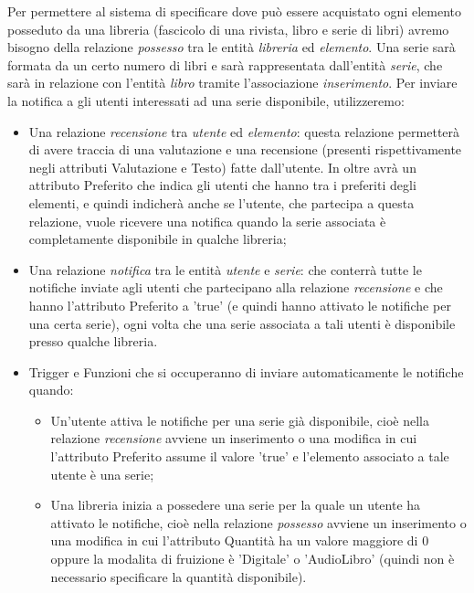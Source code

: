 \documentclass{article}
\begin{document}
Per permettere al sistema di specificare dove può essere acquistato ogni elemento posseduto da una libreria (fascicolo di una rivista, libro e serie di libri) avremo bisogno della relazione \textit{possesso} tra le entità \textit{libreria} ed \textit{elemento}.
Una serie sarà formata da un certo numero di libri e sarà rappresentata dall'entità \textit{serie}, che sarà in relazione con l'entità \textit{libro} tramite l'associazione \textit{inserimento}.
Per inviare la notifica a gli utenti interessati ad una serie disponibile, utilizzeremo:
\begin{itemize}
    \item Una relazione \textit{recensione} tra \textit{utente} ed \textit{elemento}: questa relazione permetterà di avere traccia di una valutazione e una recensione (presenti rispettivamente negli attributi Valutazione e Testo) fatte dall'utente. In oltre avrà un attributo Preferito che indica gli utenti che hanno tra i preferiti degli elementi, e quindi indicherà anche se l'utente, che partecipa a questa relazione, vuole ricevere una notifica quando la serie associata è completamente disponibile in qualche libreria;
    \item Una relazione \textit{notifica} tra le entità \textit{utente} e \textit{serie}: che conterrà tutte le notifiche inviate agli utenti che partecipano alla relazione \textit{recensione} e che hanno l'attributo Preferito a 'true' (e quindi hanno attivato le notifiche per una certa serie), ogni volta che una serie associata a tali utenti è disponibile presso qualche libreria.
    \item Trigger e Funzioni che si occuperanno di inviare automaticamente le notifiche quando:
    \begin{itemize}
        \item Un'utente attiva le notifiche per una serie già disponibile, cioè nella relazione \textit{recensione} avviene un inserimento o una modifica in cui l'attributo Preferito assume il valore 'true' e l'elemento associato a tale utente è una serie;
        \item Una libreria inizia a possedere una serie per la quale un utente ha attivato le notifiche, cioè nella relazione \textit{possesso} avviene un inserimento o una modifica in cui l'attributo Quantità ha un valore maggiore di 0 oppure la modalita di fruizione è 'Digitale' o 'AudioLibro' (quindi non è necessario specificare la quantità disponibile).
    \end{itemize} 
\end{itemize}
\end{document}
